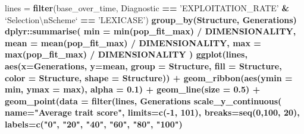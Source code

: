 \documentclass[]{book}
\newenvironment{Shaded}{\begin{snugshade}}{\end{snugshade}}
\newcommand{\CharTok}[1]{\textcolor[rgb]{0.31,0.60,0.02}{#1}}
\newcommand{\DataTypeTok}[1]{\textcolor[rgb]{0.13,0.29,0.53}{#1}}
\newcommand{\DecValTok}[1]{\textcolor[rgb]{0.00,0.00,0.81}{#1}}
\newcommand{\FloatTok}[1]{\textcolor[rgb]{0.00,0.00,0.81}{#1}}
\newcommand{\KeywordTok}[1]{\textcolor[rgb]{0.13,0.29,0.53}{\textbf{#1}}}
\newcommand{\NormalTok}[1]{#1}
\newcommand{\OperatorTok}[1]{\textcolor[rgb]{0.81,0.36,0.00}{\textbf{#1}}}
\newcommand{\StringTok}[1]{\textcolor[rgb]{0.31,0.60,0.02}{#1}}
\begin{document}
\begin{Shaded}
\begin{Highlighting}[]
\NormalTok{lines =}\StringTok{ }\KeywordTok{filter}\NormalTok{(base_over_time, Diagnostic }\OperatorTok{==}\StringTok{ 'EXPLOITATION_RATE'} \OperatorTok{&}\StringTok{ `}\DataTypeTok{Selection}\CharTok{\textbackslash{}n}\DataTypeTok{Scheme}\StringTok{`} \OperatorTok{==}\StringTok{ 'LEXICASE'}\NormalTok{) }\OperatorTok{%>%}
\StringTok{  }\KeywordTok{group_by}\NormalTok{(Structure, Generations) }\OperatorTok{%>%}
\StringTok{  }\NormalTok{dplyr}\OperatorTok{::}\KeywordTok{summarise}\NormalTok{(}
    \DataTypeTok{min =} \KeywordTok{min}\NormalTok{(pop_fit_max) }\OperatorTok{/}\StringTok{ }\NormalTok{DIMENSIONALITY,}
    \DataTypeTok{mean =} \KeywordTok{mean}\NormalTok{(pop_fit_max) }\OperatorTok{/}\StringTok{ }\NormalTok{DIMENSIONALITY,}
    \DataTypeTok{max =} \KeywordTok{max}\NormalTok{(pop_fit_max) }\OperatorTok{/}\StringTok{ }\NormalTok{DIMENSIONALITY}
\NormalTok{  )}
\KeywordTok{ggplot}\NormalTok{(lines, }\KeywordTok{aes}\NormalTok{(}\DataTypeTok{x=}\NormalTok{Generations, }\DataTypeTok{y=}\NormalTok{mean, }\DataTypeTok{group =}\NormalTok{ Structure, }\DataTypeTok{fill =}\NormalTok{ Structure, }\DataTypeTok{color =}\NormalTok{ Structure, }\DataTypeTok{shape =}\NormalTok{ Structure)) }\OperatorTok{+}
\StringTok{  }\KeywordTok{geom_ribbon}\NormalTok{(}\KeywordTok{aes}\NormalTok{(}\DataTypeTok{ymin =}\NormalTok{ min, }\DataTypeTok{ymax =}\NormalTok{ max), }\DataTypeTok{alpha =} \FloatTok{0.1}\NormalTok{) }\OperatorTok{+}
\StringTok{  }\KeywordTok{geom_line}\NormalTok{(}\DataTypeTok{size =} \FloatTok{0.5}\NormalTok{) }\OperatorTok{+}
\StringTok{  }\KeywordTok{geom_point}\NormalTok{(}\DataTypeTok{data =} \KeywordTok{filter}\NormalTok{(lines, Generations }\OperatorTok{%%}\StringTok{ }\DecValTok{2000} \OperatorTok{==}\StringTok{ }\DecValTok{0}\NormalTok{), }\DataTypeTok{size =} \FloatTok{2.5}\NormalTok{, }\DataTypeTok{stroke =} \FloatTok{2.0}\NormalTok{, }\DataTypeTok{alpha =} \FloatTok{1.0}\NormalTok{) }\OperatorTok{+}
\StringTok{  }\KeywordTok{scale_y_continuous}\NormalTok{(}
    \DataTypeTok{name=}\StringTok{"Average trait score"}\NormalTok{,}
    \DataTypeTok{limits=}\KeywordTok{c}\NormalTok{(}\OperatorTok{-}\DecValTok{1}\NormalTok{, }\DecValTok{101}\NormalTok{),}
    \DataTypeTok{breaks=}\KeywordTok{seq}\NormalTok{(}\DecValTok{0}\NormalTok{,}\DecValTok{100}\NormalTok{, }\DecValTok{20}\NormalTok{),}
    \DataTypeTok{labels=}\KeywordTok{c}\NormalTok{(}\StringTok{"0"}\NormalTok{, }\StringTok{"20"}\NormalTok{, }\StringTok{"40"}\NormalTok{, }\StringTok{"60"}\NormalTok{, }\StringTok{"80"}\NormalTok{, }\StringTok{"100"}\NormalTok{)}
}}}
\end{Highlighting}
\end{Shaded}
\end{document}
